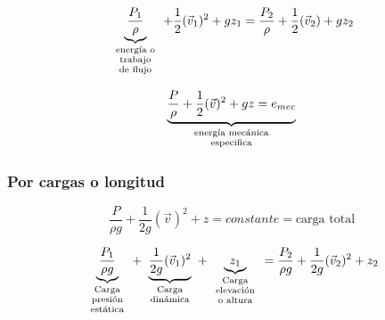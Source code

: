 \[
    \underbrace{ \frac{ P_{1} }{ \rho } }_{
        \begin{scriptsize}
            \begin{array}{cc}
                 \text{energía o}  \\
                 \text{trabajo} \\
                 \text{de flujo}
            \end{array}
        \end{scriptsize} } +
        \frac{ 1 }{ 2 } ( \vec{v}_{1} )^{2} + g z_{1} = \frac{ P_{2} }{ \rho } + \frac{ 1 }{ 2 } ( \vec{v}_{2} ) + g z_{2}
\]

\[
    \underbrace{ \frac{ P }{ \rho } + \frac{ 1 }{ 2 } (\vec{v})^{2} + gz = e_{mec} }_{ 
        \begin{scriptsize}
            \begin{array}{cc}
                 \text{energía mecánica}  \\
                 \text{especifica} 
            \end{array}
        \end{scriptsize} }
\]

\subsubsection{Por cargas o longitud}

\[
    \frac{ P }{ \rho g } + \frac{ 1 }{ 2g } (\vec{v})^{2} + z = constante = \text{carga total}
\]

\[
    \underbrace{ \frac{ P_{1} }{ \rho g } }_{
        \begin{scriptsize}
            \begin{array}{cc}
                 \text{Carga}  \\
                 \text{presión} \\
                 \text{estática}
            \end{array}
        \end{scriptsize} } +
    \underbrace{ \frac{ 1 }{ 2g } (\vec{v}_{1})^{2} }_{
        \begin{scriptsize}
            \begin{array}{cc}
                 \text{Carga}  \\
                 \text{dinámica} 
            \end{array}
        \end{scriptsize} } +
    \underbrace{ z_{1} }_{
        \begin{scriptsize}
            \begin{array}{cc}
                 \text{Carga}  \\
                 \text{elevación} \\
                 \text{o altura}
            \end{array}
        \end{scriptsize} } = \frac{ P_{2} }{ \rho g } + \frac{ 1 }{ 2g } (\vec{v}_{2})^{2} + z_{2}
\]

